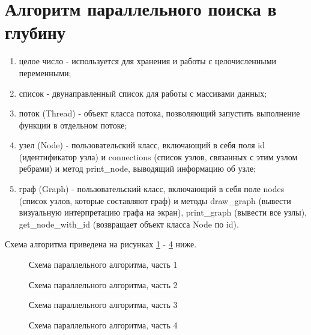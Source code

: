 \section{Алгоритм параллельного поиска в глубину}
\begin{enumerate}
	\item целое число - используется для хранения и работы с целочисленными переменными;
	\item список - двунаправленный список для работы с массивами данных;
	\item поток (Thread) - объект класса потока, позволяющий запустить выполнение функции в отдельном потоке;
	\item узел (Node) - пользовательский класс, включающий в себя поля id (идентификатор узла) и connections (список узлов, связанных с этим узлом ребрами) и метод print\_node, выводящий информацию об узле;\\
	\item граф (Graph) - пользовательский класс, включающий в себя поле nodes (список узлов, которые составляют граф) и методы draw\_graph (вывести визуальную интерпретацию графа на экран), print\_graph (вывести все узлы), get\_node\_with\_id (возвращает объект класса Node по id).\\
\end{enumerate}

Схема алгоритма приведена на рисунках \ref{fig:algos_parallel_1} - \ref{fig:algos_parallel_4} ниже.

\begin{figure}[H]
	\caption{Схема параллельного алгоритма, часть 1}
	\label{fig:algos_parallel_1}
\end{figure}

\begin{figure}[H]
	\caption{Схема параллельного алгоритма, часть 2}
	\label{fig:algos_parallel_2}
\end{figure}

\begin{figure}[H]
	\caption{Схема параллельного алгоритма, часть 3}
	\label{fig:algos_parallel_3}
\end{figure}

\begin{figure}[H]
	\caption{Схема параллельного алгоритма, часть 4}
	\label{fig:algos_parallel_4}
\end{figure}

